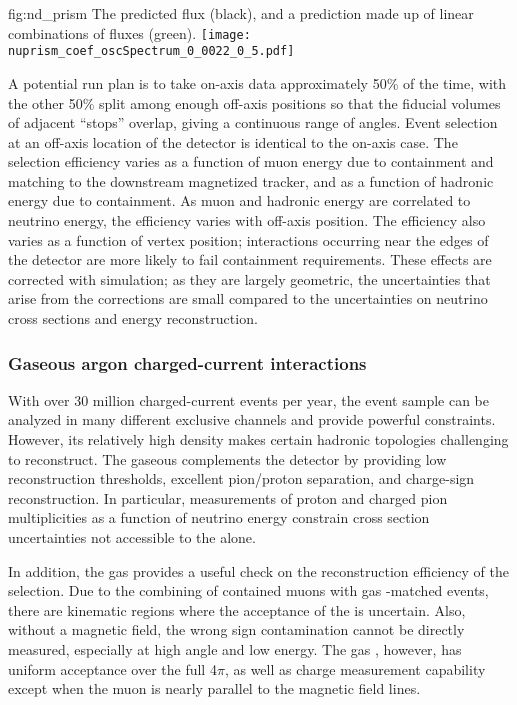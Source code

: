 \begin{dunefigure}{fig:nd_prism}
{The predicted  flux (black), and a prediction made up of linear combinations of  fluxes (green).}
 \texttt{[image: nuprism\_coef\_oscSpectrum\_0\_0022\_0\_5.pdf]}
\end{dunefigure}

A potential run plan is to take on-axis data approximately 50\% of the time, with the other 50\% split among enough off-axis positions so that the fiducial volumes of adjacent ``stops'' overlap, giving a continuous range of angles. Event selection at an off-axis location of the  detector is identical to the on-axis case. The selection efficiency varies as a function of muon energy due to containment and matching to the downstream magnetized tracker, and as a function of hadronic energy due to containment. As muon and hadronic energy are correlated to neutrino energy, the efficiency varies with off-axis position. The efficiency also varies as a function of vertex position; interactions occurring near the edges of the detector are more likely to fail containment requirements. These effects are corrected with simulation; as they are largely geometric, the uncertainties that arise from the corrections are small compared to the uncertainties on neutrino cross sections and energy reconstruction. %

\subsubsection{Gaseous argon charged-current interactions}

With over 30 million charged-current events per year, the  event sample can be analyzed in many different exclusive channels and provide powerful constraints. However, its relatively high density makes certain hadronic topologies challenging to reconstruct. The gaseous  complements the  detector by providing low reconstruction thresholds, excellent pion/proton separation, and charge-sign reconstruction. In particular, measurements of proton and charged pion multiplicities as a function of neutrino energy constrain cross section uncertainties not accessible to the  alone.

In addition, the gas  provides a useful check on the reconstruction efficiency of the  selection. Due to the combining of contained muons with gas -matched events, there are kinematic regions where the acceptance of the  is uncertain. Also, without a magnetic field, the wrong sign contamination cannot be directly measured, especially at high angle and low energy. The gas , however, has uniform acceptance over the full 4$\pi$, as well as charge measurement capability except when the muon is nearly parallel to the magnetic field lines.

